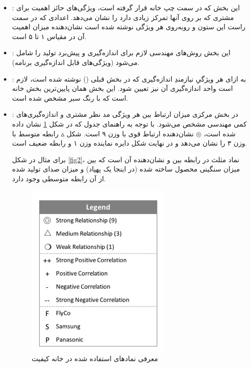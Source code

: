 {\begin{enumerate}[a)]
\begin{itemize}
\item
{}: این بخش که در سمت چپ خانه قرار گرفته است، ویژگی‌های حائز اهمیت برای مشتری که بر روی آنها تمرکز زیادی دارد را نشان می‌دهد. اعدادی که در سمت راست این ستون و روبه‌روی هر ویژگی‌ نوشته شده است نشان‌دهنده میزان اهمیت آن در مقیاس ۱ تا ۵ است.

\item
{}: این بخش روش‌های مهندسی لازم برای اندازه‌گیری و پیش‌برد تولید را شامل می‌شود (ویژگی‌های قابل اندازه‌گیری برنامه). 

\item
{}: به ازای هر ویژگیِ نیازمندِ اندازه‌گیری که در بخش قبلی () نوشته شده است، لازم است واحد اندازه‌گیری آن نیز تعیین شود. این بخش همان پایین‌ترین بخش خانه است که با رنگ سبر مشخص شده است.

\item
{}: در بخش مرکزی میزان ارتباط بین هر ویژگی مد نظر مشتری و اندازه‌گیری‌های کمی مهندسی مشخص می‌شود. با توجه به راهنمای جدول که در شکل \ref{fig3} نشان داده شده است، $\circledcirc$ نشان‌دهنده ارتباط قوی با وزن ۹ است. شکل $\vartriangle$ رابطه متوسط با وزن ۳ را نشان می‌دهد و در نهایت شکل دایره نماینده وزن ۱ و رابطه ضعیف است.

برای مثال در شکل \ref{fig2}، نماد مثلث در رابطه بین  و  نشان‌دهنده آن است که بین میزان سنگینی محصول ساخته شده (در اینجا یک پهپاد) و میزان صدای تولید شده از آن رابطه متوسطی وجود دارد. 

\begin{figure}[h]
	\centering
	\includegraphics[scale=0.8]{figs/2-2}
	\caption{معرفی نمادهای استفاده شده در خانه کیفیت}
	\label{fig3}
\end{figure}


\end{itemize}
\end{enumerate}}
